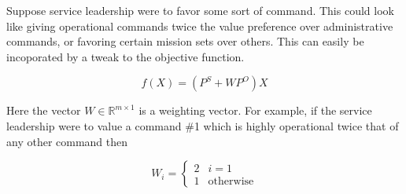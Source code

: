 Suppose service leadership were to favor some sort of command. This could look like giving operational commands twice the value preference over administrative commands, or favoring certain mission sets over others. This can easily be incoporated by a tweak to the objective function. 

\[f(X) = (P^S + WP^O)X \]

Here the vector $W \in \mathbb{R}^{m \times 1}$ is a weighting vector. For example, if the service leadership were to value a command \#1 which is highly operational twice that of any other command then

\[ W_i = \begin{cases} 2 & i = 1\\ 1 & \text{otherwise} \end{cases}\] 
